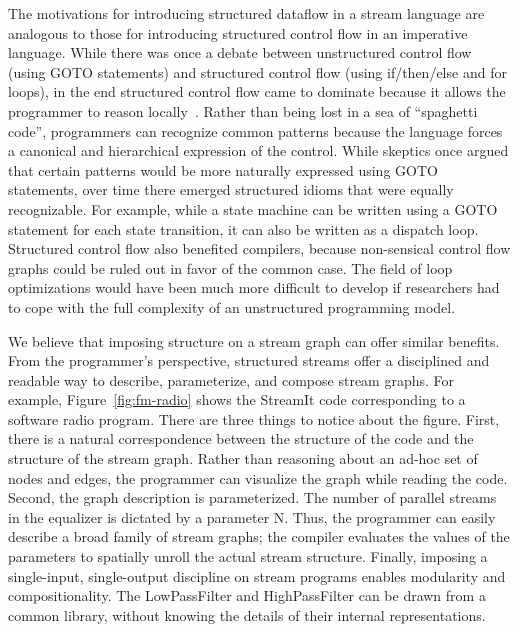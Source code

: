 
The motivations for introducing structured dataflow in a stream
language are analogous to those for introducing structured control
flow in an imperative language.  While there was once a debate between
unstructured control flow (using GOTO statements) and structured
control flow (using if/then/else and for loops), in the end structured
control flow came to dominate because it allows the programmer to
reason locally~\cite{dijkstra_go_1968}.  Rather than being lost in a
sea of ``spaghetti code'', programmers can recognize common patterns
because the language forces a canonical and hierarchical expression of
the control.  While skeptics once argued that certain patterns would
be more naturally expressed using GOTO statements, over time there
emerged structured idioms that were equally recognizable.  For
example, while a state machine can be written using a GOTO statement
for each state transition, it can also be written as a dispatch loop.
Structured control flow also benefited compilers, because non-sensical
control flow graphs could be ruled out in favor of the common case.
The field of loop optimizations would have been much more difficult to
develop if researchers had to cope with the full complexity of an
unstructured programming model.

We believe that imposing structure on a stream graph can offer similar
benefits.  From the programmer's perspective, structured streams offer
a disciplined and readable way to describe, parameterize, and compose
stream graphs.  For example, Figure~\ref{fig:fm-radio} shows the
StreamIt code corresponding to a software radio program.  There are
three things to notice about the figure.  First, there is a natural
correspondence between the structure of the code and the structure of
the stream graph.  Rather than reasoning about an ad-hoc set of nodes
and edges, the programmer can visualize the graph while reading the
code.  Second, the graph description is parameterized.  The number of
parallel streams in the equalizer is dictated by a parameter N.  Thus,
the programmer can easily describe a broad family of stream graphs;
the compiler evaluates the values of the parameters to spatially
unroll the actual stream structure.  Finally, imposing a single-input,
single-output discipline on stream programs enables modularity and
compositionality.  The LowPassFilter and HighPassFilter can be drawn
from a common library, without knowing the details of their internal
representations.

